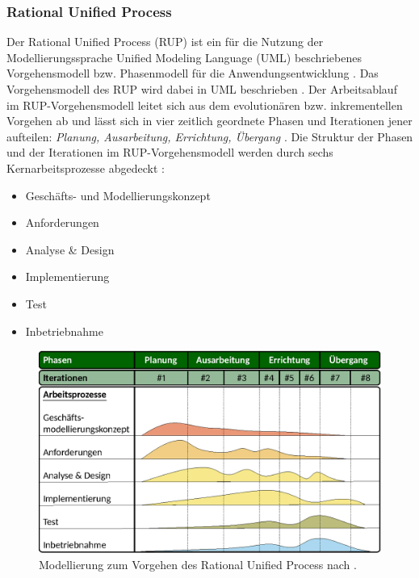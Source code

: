 \subsubsection{Rational Unified Process}
\label{sec3:model:subsubsec:rup}
Der Rational Unified Process (RUP) ist ein für die Nutzung der Modellierungssprache Unified Modeling Language (UML) beschriebenes Vorgehensmodell bzw. Phasenmodell für die Anwendungsentwicklung \cite{rup-inff}.
Das Vorgehensmodell des RUP wird dabei in UML beschrieben \cite{rup-inff}.
Der Arbeitsablauf im RUP-Vorgehensmodell leitet sich aus dem evolutionären bzw. inkrementellen Vorgehen ab und lässt sich in vier zeitlich geordnete Phasen und Iterationen jener aufteilen:
\textit{Planung, Ausarbeitung, Errichtung, Übergang} \cite{rup-inff}.
Die Struktur der Phasen und der Iterationen im RUP-Vorgehensmodell werden durch sechs Kernarbeitsprozesse abgedeckt \cite{rup-inff}:
\begin{itemize}
    \item Geschäfts- und Modellierungskonzept
    \item Anforderungen
    \item Analyse \& Design
    \item Implementierung
    \item Test
    \item Inbetriebnahme
\end{itemize}

\begin{figure}[htb]
    \centering
    \includegraphics{chapter/chapter_3/rup.eps}
    \caption{Modellierung zum Vorgehen des Rational Unified Process nach \cite{rup-img}.}
    \label{sec3:model:subsec:conc-model-metho:fig:rup}
\end{figure}


